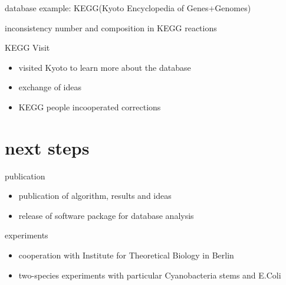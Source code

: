 \documentclass[style=ufz]{powerdot}
\begin{document}
\begin{slide}{database example: KEGG\newline (Kyoto Encyclopedia of Genes+Genomes)}
\begin{figure}
\begin{small}
\end{small}

\end{figure}
inconsistency number and composition in KEGG reactions
\end{slide}

\begin{slide}{KEGG Visit}
 \begin{itemize}
  \item visited Kyoto to learn more about the database\newline\pause
  \item exchange of ideas\newline\pause
  \item KEGG people incooperated corrections
 \end{itemize}

\end{slide}

\section{next steps}
\begin{slide}{publication}
\begin{itemize}
  \item publication of algorithm, results and ideas\newline\pause
  \item release of software package for database analysis
\end{itemize}
\end{slide}

\begin{slide}{experiments}
 \begin{itemize}
  \item cooperation with Institute for Theoretical Biology in Berlin \newline \pause
  \item two-species experiments with particular Cyanobacteria stems and E.Coli  
 \end{itemize}

\end{slide}
\end{document}
